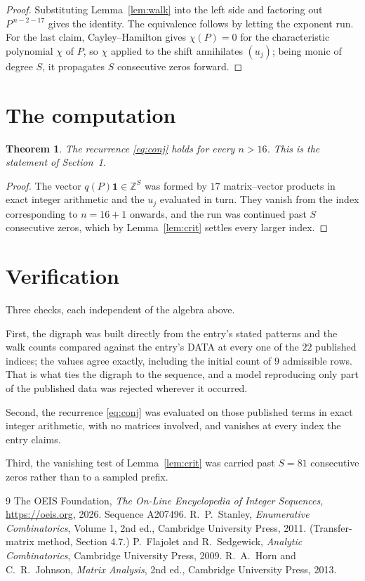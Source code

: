 \documentclass[11pt,a4paper]{article}
\theoremstyle{plain}
\newtheorem{theorem}{Theorem}
\theoremstyle{definition}
\begin{document}
\begin{proof}
Substituting Lemma~\ref{lem:walk} into the left side and factoring out
$P^{\,n-2-17}$ gives the identity. The equivalence follows by letting the exponent
run. For the last claim, Cayley--Hamilton gives $\chi(P)=0$ for the characteristic
polynomial $\chi$ of $P$, so $\chi$ applied to the shift annihilates $(u_j)$; being monic of
degree $S$, it propagates $S$ consecutive zeros forward.
\end{proof}

\section{The computation}

\begin{theorem}
The recurrence \eqref{eq:conj} holds for every $n>16$. This is the statement of
Section~1.
\end{theorem}

\begin{proof}
The vector $q(P)\mathbf{1}\in\mathbb{Z}^{S}$ was formed by $17$ matrix--vector
products in exact integer arithmetic and the $u_j$ evaluated in turn. They vanish from the
index corresponding to $n=16+1$ onwards, and the run was continued past $S$ consecutive
zeros, which by Lemma~\ref{lem:crit} settles every larger index.
\end{proof}

\section{Verification}

Three checks, each independent of the algebra above.

First, the digraph was built directly from the entry's stated patterns and the walk counts
compared against the entry's DATA at every one of the $22$ published indices; the
values agree exactly, including the initial count of $9$ admissible rows. That is
what ties the digraph to the sequence, and a model reproducing only part of the published
data was rejected wherever it occurred.

Second, the recurrence \eqref{eq:conj} was evaluated on those published terms in exact
integer arithmetic, with no matrices involved, and vanishes at every index the entry claims.

Third, the vanishing test of Lemma~\ref{lem:crit} was carried past $S=81$ consecutive
zeros rather than to a sampled prefix.

\begin{thebibliography}{9}
 The OEIS Foundation, \emph{The On-Line Encyclopedia of Integer
Sequences}, \url{https://oeis.org}, 2026. Sequence A207496.
 R.~P.~Stanley, \emph{Enumerative Combinatorics}, Volume 1, 2nd ed.,
Cambridge University Press, 2011. (Transfer-matrix method, Section 4.7.)
 P.~Flajolet and R.~Sedgewick, \emph{Analytic Combinatorics}, Cambridge
University Press, 2009.
 R.~A.~Horn and C.~R.~Johnson, \emph{Matrix Analysis}, 2nd ed., Cambridge
University Press, 2013.
\end{thebibliography}
\end{document}
